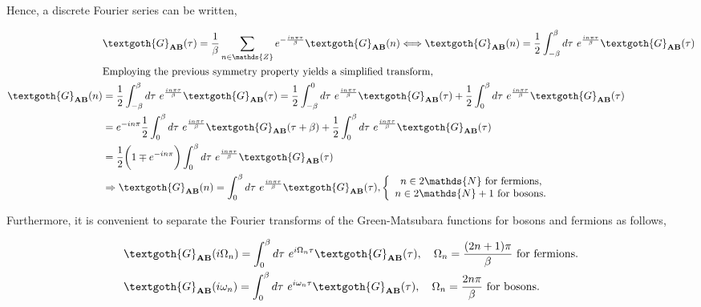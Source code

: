 Hence, a discrete Fourier series can be written, 

\begin{equation}
\begin{split}
    &{\textgoth{G}_{{\bf AB}}}(\tau) = \frac{1}{\beta} \sum_{n \in \mathds{Z}} e^{-\frac{in\pi\tau}{\beta}} {\textgoth{G}_{{\bf AB}}}(n) \Longleftrightarrow {\textgoth{G}_{{\bf AB}}}(n) = \frac{1}{2} \int_{-\beta}^{\beta} d\tau \blanky e^{\frac{in\pi\tau}{\beta}} {\textgoth{G}_{{\bf AB}}}(\tau) \\
    &\textnormal{Employing the previous symmetry property yields a simplified transform, }\\
    {\textgoth{G}_{{\bf AB}}}(n) &= \frac{1}{2} \int_{-\beta}^{\beta} d\tau \blanky e^{\frac{in\pi\tau}{\beta}} {\textgoth{G}_{{\bf AB}}}(\tau) = \frac{1}{2} \int_{-\beta}^{0} d\tau \blanky e^{\frac{in\pi\tau}{\beta}} {\textgoth{G}_{{\bf AB}}}(\tau) + \frac{1}{2} \int_{0}^{\beta} d\tau \blanky e^{\frac{in\pi\tau}{\beta}} {\textgoth{G}_{{\bf AB}}}(\tau) \\
    &= e^{-in\pi} \frac{1}{2} \int_{0}^{\beta} d\tau \blanky e^{\frac{in\pi\tau}{\beta}} {\textgoth{G}_{{\bf AB}}}(\tau + \beta) + \frac{1}{2} \int_{0}^{\beta} d\tau \blanky e^{\frac{in\pi\tau}{\beta}} {\textgoth{G}_{{\bf AB}}}(\tau) \\
    &= \frac{1}{2} \bigg(1 \mp e^{-in\pi}\bigg) \int_{0}^{\beta} d\tau \blanky e^{\frac{in\pi\tau}{\beta}} {\textgoth{G}_{{\bf AB}}}(\tau) \\
    &\Rightarrow {\textgoth{G}_{{\bf AB}}}(n) = \int_{0}^{\beta} d\tau \blanky e^{\frac{in\pi\tau}{\beta}} {\textgoth{G}_{{\bf AB}}}(\tau), \left\{ \begin{array}{cc}
        n \in 2\mathds{N} \textnormal{ for fermions, }   \\
        n \in 2\mathds{N}+1 \textnormal{ for bosons. }
    \end{array} \right.\\
\end{split}
\end{equation}

Furthermore, it is convenient to separate the Fourier transforms of the Green-Matsubara functions for bosons and fermions as follows,

\begin{equation}
    \begin{split}
        &{\textgoth{G}_{{\bf AB}}}(i\Omega_n) = \int_{0}^{\beta} d\tau \blanky e^{i \Omega_n \tau} {\textgoth{G}_{{\bf AB}}}(\tau), \quad \Omega_n = \frac{(2n+1)\pi}{\beta} \textnormal{ for fermions.} \\
        &{\textgoth{G}_{{\bf AB}}}(i\omega_n) = \int_{0}^{\beta} d\tau \blanky e^{i \omega_n \tau} {\textgoth{G}_{{\bf AB}}}(\tau), \quad \Omega_n = \frac{2n\pi}{\beta} \textnormal{ for bosons.}
    \end{split}
\end{equation}

